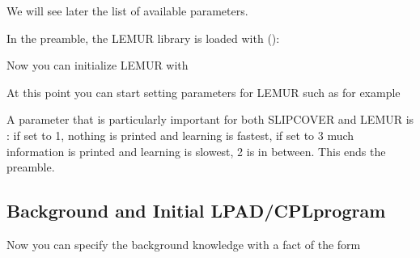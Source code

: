 \documentclass[letterpaper,10pt,english]{sphinxmanual}
\begin{document}
\sphinxAtStartPar
We will see later the list of available parameters.

\sphinxAtStartPar
In the preamble, the LEMUR library is loaded with ():

\begin{sphinxVerbatim}[commandchars=\\\{\}]
 
\end{sphinxVerbatim}

\sphinxAtStartPar
Now you can initialize LEMUR with

\begin{sphinxVerbatim}[commandchars=\\\{\}]
 
\end{sphinxVerbatim}

\sphinxAtStartPar
At this point you can start setting parameters for LEMUR such as for example

\begin{sphinxVerbatim}[commandchars=\\\{\}]
 
\end{sphinxVerbatim}

\sphinxAtStartPar
A parameter that is particularly important for both SLIPCOVER and LEMUR is : if set to 1, nothing is printed and learning is fastest, if set to 3 much information is printed and learning is slowest, 2 is in between. This ends the preamble.


\subsection{Background and Initial LPAD/CPL\sphinxhyphen{}program}
\label{\detokenize{index:background-and-initial-lpad-cpl-program}}
\sphinxAtStartPar
Now you can specify the background knowledge with a fact of the form

\begin{sphinxVerbatim}[commandchars=\\\{\}]
    
\end{sphinxVerbatim}
\end{document}
